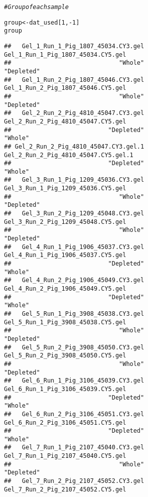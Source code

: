 \documentclass{article}\usepackage[]{graphicx}\usepackage[]{color}
\makeatletter
\newcommand{\hlnum}[1]{\textcolor[rgb]{0.686,0.059,0.569}{#1}}%
\newcommand{\hlcom}[1]{\textcolor[rgb]{0.678,0.584,0.686}{\textit{#1}}}%
\newcommand{\hlopt}[1]{\textcolor[rgb]{0,0,0}{#1}}%
\newcommand{\hlstd}[1]{\textcolor[rgb]{0.345,0.345,0.345}{#1}}%
\newcommand{\hlkwb}[1]{\textcolor[rgb]{0.69,0.353,0.396}{#1}}%
\newenvironment{kframe}{%
 \def\at@end@of@kframe{}%
 \ifinner\ifhmode%
  \def\at@end@of@kframe{\end{minipage}}%
  \begin{minipage}{\columnwidth}%
 \fi\fi%
 \def\FrameCommand##1{\hskip\@totalleftmargin \hskip-\fboxsep
 \colorbox{shadecolor}{##1}\hskip-\fboxsep
     \hskip-\linewidth \hskip-\@totalleftmargin \hskip\columnwidth}%
 \MakeFramed {\advance\hsize-\width
   \@totalleftmargin\z@ \linewidth\hsize
   \@setminipage}}%
 {\par\unskip\endMakeFramed%
 \at@end@of@kframe}
\newenvironment{knitrout}{}{} %
\makeatother
\begin{document}
\begin{knitrout}
\color{fgcolor}\begin{kframe}
\begin{alltt}
\hlcom{# Group of each sample}

\hlstd{group} \hlkwb{<-} \hlstd{dat_used[}\hlnum{1}\hlstd{,} \hlopt{-}\hlnum{1}\hlstd{]}
\hlstd{group}
\end{alltt}
\begin{verbatim}
##   Gel_1_Run_1_Pig_1807_45034.CY3.gel   Gel_1_Run_1_Pig_1807_45034.CY5.gel 
##                              "Whole"                           "Depleted" 
##   Gel_1_Run_2_Pig_1807_45046.CY3.gel   Gel_1_Run_2_Pig_1807_45046.CY5.gel 
##                              "Whole"                           "Depleted" 
##   Gel_2_Run_2_Pig_4810_45047.CY3.gel   Gel_2_Run_2_Pig_4810_45047.CY5.gel 
##                           "Depleted"                              "Whole" 
## Gel_2_Run_2_Pig_4810_45047.CY3.gel.1 Gel_2_Run_2_Pig_4810_45047.CY5.gel.1 
##                           "Depleted"                              "Whole" 
##   Gel_3_Run_1_Pig_1209_45036.CY3.gel   Gel_3_Run_1_Pig_1209_45036.CY5.gel 
##                              "Whole"                           "Depleted" 
##   Gel_3_Run_2_Pig_1209_45048.CY3.gel   Gel_3_Run_2_Pig_1209_45048.CY5.gel 
##                              "Whole"                           "Depleted" 
##   Gel_4_Run_1_Pig_1906_45037.CY3.gel   Gel_4_Run_1_Pig_1906_45037.CY5.gel 
##                           "Depleted"                              "Whole" 
##   Gel_4_Run_2_Pig_1906_45049.CY3.gel   Gel_4_Run_2_Pig_1906_45049.CY5.gel 
##                           "Depleted"                              "Whole" 
##   Gel_5_Run_1_Pig_3908_45038.CY3.gel   Gel_5_Run_1_Pig_3908_45038.CY5.gel 
##                              "Whole"                           "Depleted" 
##   Gel_5_Run_2_Pig_3908_45050.CY3.gel   Gel_5_Run_2_Pig_3908_45050.CY5.gel 
##                              "Whole"                           "Depleted" 
##   Gel_6_Run_1_Pig_3106_45039.CY3.gel   Gel_6_Run_1_Pig_3106_45039.CY5.gel 
##                           "Depleted"                              "Whole" 
##   Gel_6_Run_2_Pig_3106_45051.CY3.gel   Gel_6_Run_2_Pig_3106_45051.CY5.gel 
##                           "Depleted"                              "Whole" 
##   Gel_7_Run_1_Pig_2107_45040.CY3.gel   Gel_7_Run_1_Pig_2107_45040.CY5.gel 
##                              "Whole"                           "Depleted" 
##   Gel_7_Run_2_Pig_2107_45052.CY3.gel   Gel_7_Run_2_Pig_2107_45052.CY5.gel 

\end{verbatim}
\end{kframe}
\end{knitrout}
\end{document}
